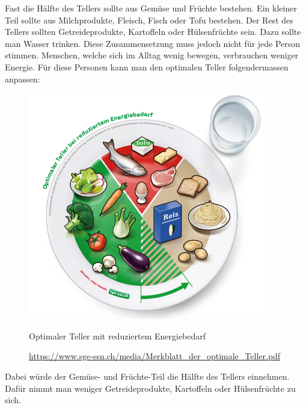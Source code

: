 \newline
Fast die Hälfte des Tellers sollte aus Gemüse und Früchte bestehen. Ein kleiner Teil sollte aus Milchprodukte, Fleisch, Fisch oder Tofu bestehen. Der Rest des Tellers sollten Getreideprodukte, Kartoffeln oder Hülsenfrüchte sein. Dazu sollte man Wasser trinken.
\newline
Diese Zusammensetzung muss jedoch nicht für jede Person stimmen. Menschen, welche sich im Alltag wenig bewegen, verbrauchen weniger Energie. Für diese Personen kann man den optimalen Teller folgendermassen anpassen:
\newline
\begin{figure}[!hbpt]
  \centering
  \includegraphics[width=0.5\linewidth]{./images/optimale_teller_energie.png}
  \caption{Optimaler Teller mit reduziertem Energiebedarf}
  \label{fig:teller_2}
  \caption*{\url{https://www.sge-ssn.ch/media/Merkblatt_der_optimale_Teller.pdf}}
\end{figure}
\newline
Dabei würde der Gemüse- und Früchte-Teil die Hälfte des Tellers einnehmen. Dafür nimmt man weniger Getreideprodukte, Kartoffeln oder Hülsenfrüchte zu sich.
